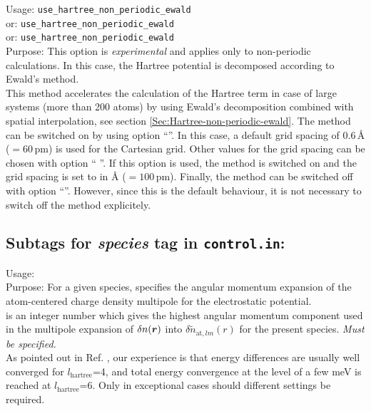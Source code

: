 {
  \noindent
  Usage: \texttt{use\_hartree\_non\_periodic\_ewald}  \\
  or:    \texttt{use\_hartree\_non\_periodic\_ewald} 
                                                         \\
  or:    \texttt{use\_hartree\_non\_periodic\_ewald}  \\[1.0ex]
  Purpose: This option is \emph{experimental} and applies only to non-periodic
  calculations. In this case, the Hartree potential is decomposed according to
  Ewald's method.  \\[1.0ex]
}
This method accelerates the calculation of the Hartree term in case of large
systems (more than 200 atoms) by using Ewald's decomposition combined with
spatial interpolation, see section \ref{Sec:Hartree-non-periodic-ewald}. The
method can be switched on by using option ``''. In this case, a
default grid spacing of 0.6\,\r{A} ($=60\,$pm) is used for the Cartesian grid.
Other values for the grid spacing can be chosen with option
`` ''. If this option is used, the method is
switched on and the grid spacing is set to  in \r{A} ($=100\,$pm).
Finally, the method can be switched off with option ``''.
However, since this is the default behaviour, it is not necessary to switch off
the method explicitely.


\newpage



\subsection*{Subtags for \emph{species} tag in \texttt{control.in}:}

{
  \noindent
  Usage:   \\[1.0ex]
  Purpose: For a given species, specifies the angular momentum
    expansion of the atom-centered charge density multipole for the
    electrostatic potential. \\[1.0ex]
   is an integer number which gives the highest angular
    momentum component used in the multipole expansion of $\delta
    n(\mbox{\boldmath$r$})$ into $\delta\tilde{n}_{\text{at},lm}(r)$ for the
    present species. \emph{Must be specified.} \\
}
As pointed out in
Ref. \cite{Blum08}, our experience is that energy differences are
usually well converged for $l_\text{hartree}$=4, and total energy
convergence at the level of a few meV is reached at
$l_\text{hartree}$=6. Only in exceptional cases should different
settings be required. 
